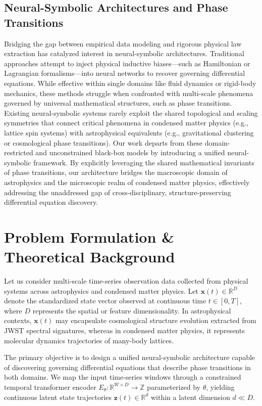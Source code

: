 \documentclass[10pt,twocolumn]{article}
\begin{document}
\subsection{Neural-Symbolic Architectures and Phase Transitions}
Bridging the gap between empirical data modeling and rigorous physical law extraction has catalyzed interest in neural-symbolic architectures. Traditional approaches attempt to inject physical inductive biases—such as Hamiltonian or Lagrangian formalisms—into neural networks to recover governing differential equations. While effective within single domains like fluid dynamics or rigid-body mechanics, these methods struggle when confronted with multi-scale phenomena governed by universal mathematical structures, such as phase transitions. Existing neural-symbolic systems rarely exploit the shared topological and scaling symmetries that connect critical phenomena in condensed matter physics (e.g., lattice spin systems) with astrophysical equivalents (e.g., gravitational clustering or cosmological phase transitions). Our work departs from these domain-restricted and unconstrained black-box models by introducing a unified neural-symbolic framework. By explicitly leveraging the shared mathematical invariants of phase transitions, our architecture bridges the macroscopic domain of astrophysics and the microscopic realm of condensed matter physics, effectively addressing the unaddressed gap of cross-disciplinary, structure-preserving differential equation discovery.

\section{Problem Formulation \& Theoretical Background}
Let us consider multi-scale time-series observation data collected from physical systems across astrophysics and condensed matter physics. Let $\mathbf{x}(t) \in \mathbb{R}^D$ denote the standardized state vector observed at continuous time $t \in [0, T]$, where $D$ represents the spatial or feature dimensionality. In astrophysical contexts, $\mathbf{x}(t)$ may encapsulate cosmological structure evolution extracted from JWST spectral signatures, whereas in condensed matter physics, it represents molecular dynamics trajectories of many-body lattices.

The primary objective is to design a unified neural-symbolic architecture capable of discovering governing differential equations that describe phase transitions in both domains. We map the input time-series windows through a constrained temporal transformer encoder $E_\theta: \mathbb{R}^{W \times D} \to \mathbb{Z}$ parameterized by $\theta$, yielding continuous latent state trajectories $\mathbf{z}(t) \in \mathbb{R}^{d}$ within a latent dimension $d \ll D$. 
\end{document}
